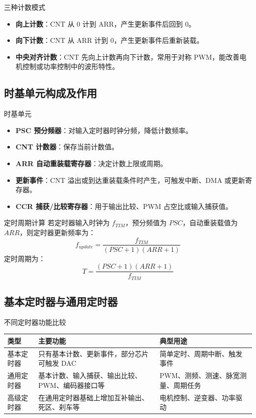 \documentclass[UTF8,fontset=none,12pt]{ctexart}
\begin{document}
\begin{pointbox}{三种计数模式}
\begin{itemize}
  \item \textbf{向上计数}：CNT 从 0 计到 ARR，产生更新事件后回到 0。
  \item \textbf{向下计数}：CNT 从 ARR 计到 0，产生更新事件后重新装载。
  \item \textbf{中央对齐计数}：CNT 先向上计数再向下计数，常用于对称 PWM，能改善电机控制或功率控制中的波形特性。
\end{itemize}
\end{pointbox}

\subsection{时基单元构成及作用}
\begin{pointbox}{时基单元}
\begin{itemize}
  \item \textbf{PSC 预分频器}：对输入定时器时钟分频，降低计数频率。
  \item \textbf{CNT 计数器}：保存当前计数值。
  \item \textbf{ARR 自动重装载寄存器}：决定计数上限或周期。
  \item \textbf{更新事件}：CNT 溢出或到达重装载条件时产生，可触发中断、DMA 或更新寄存器。
  \item \textbf{CCR 捕获/比较寄存器}：用于输出比较、PWM 占空比或输入捕获值。
\end{itemize}
\end{pointbox}

\begin{pointbox}{定时周期计算}
若定时器输入时钟为 $f_{TIM}$，预分频值为 $PSC$，自动重装载值为 $ARR$，则定时器更新频率为：
\[
  f_{update}=\frac{f_{TIM}}{(PSC+1)(ARR+1)}
\]
定时周期为：
\[
  T=\frac{(PSC+1)(ARR+1)}{f_{TIM}}
\]
\end{pointbox}

\subsection{基本定时器与通用定时器}
\begin{pointbox}{不同定时器功能比较}
\begin{tabularx}{\linewidth}{@{}p{3cm}p{5.4cm}Y@{}}
\toprule
\textbf{类型} & \textbf{主要功能} & \textbf{典型用途} \\
\midrule
基本定时器 & 只有基本计数、更新事件，部分芯片可触发 DAC & 简单定时、周期中断、触发事件 \\
通用定时器 & 基本计数、输入捕获、输出比较、PWM、编码器接口等 & PWM、测频、测速、脉宽测量、周期任务 \\
高级定时器 & 在通用定时器基础上增加互补输出、死区、刹车等 & 电机控制、逆变器、功率驱动 \\
\bottomrule
\end{tabularx}
\end{pointbox}
\end{document}
